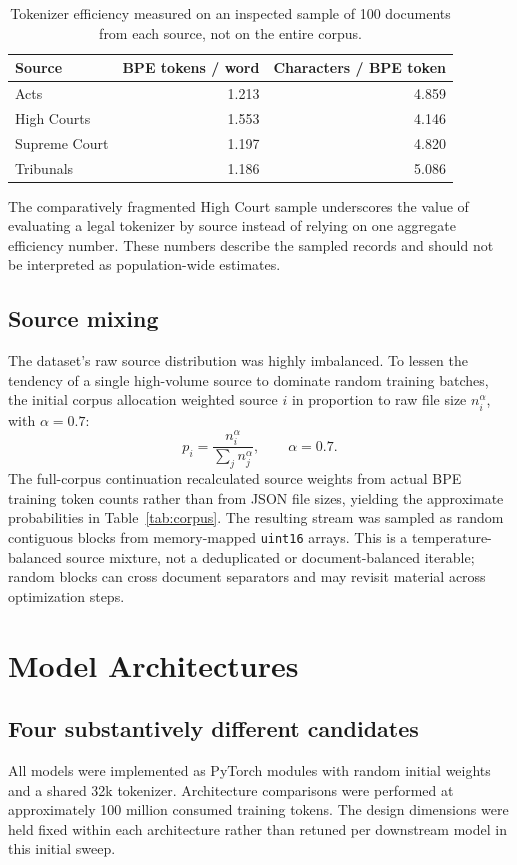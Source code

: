 \documentclass[11pt,a4paper]{article}
\newcommand{\method}[1]{\texttt{#1}}
\begin{document}
\begin{table}[htbp]\centering\small
\caption{Tokenizer efficiency measured on an inspected sample of 100 documents from each source, not on the entire corpus.}
\label{tab:tok}
\begin{tabular}{lrr}
\toprule Source & BPE tokens / word & Characters / BPE token \\
\midrule Acts & 1.213 & 4.859 \\
High Courts & 1.553 & 4.146 \\
Supreme Court & 1.197 & 4.820 \\
Tribunals & 1.186 & 5.086 \\
\bottomrule
\end{tabular}
\end{table}

The comparatively fragmented High Court sample underscores the value of evaluating a legal tokenizer by source instead of relying on one aggregate efficiency number. These numbers describe the sampled records and should not be interpreted as population-wide estimates.

\subsection{Source mixing}
The dataset's raw source distribution was highly imbalanced. To lessen the tendency of a single high-volume source to dominate random training batches, the initial corpus allocation weighted source \(i\) in proportion to raw file size \(n_i^{\alpha}\), with \(\alpha=0.7\):
\begin{equation}
 p_i = \frac{n_i^{\alpha}}{\sum_j n_j^{\alpha}},\qquad \alpha=0.7.
\end{equation}
The full-corpus continuation recalculated source weights from actual BPE training token counts rather than from JSON file sizes, yielding the approximate probabilities in Table~\ref{tab:corpus}. The resulting stream was sampled as random contiguous blocks from memory-mapped \method{uint16} arrays. This is a temperature-balanced source mixture, not a deduplicated or document-balanced iterable; random blocks can cross document separators and may revisit material across optimization steps.

\section{Model Architectures}
\subsection{Four substantively different candidates}
All models were implemented as PyTorch modules with random initial weights and a shared 32k tokenizer. Architecture comparisons were performed at approximately 100 million consumed training tokens. The design dimensions were held fixed within each architecture rather than retuned per downstream model in this initial sweep.
\end{document}
